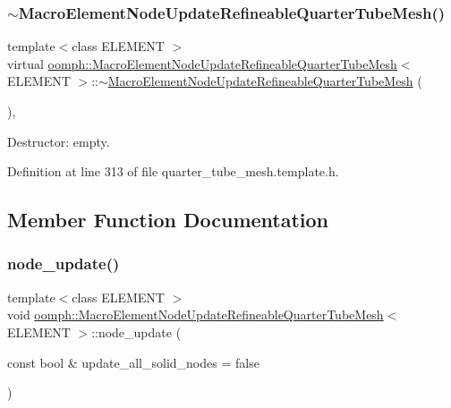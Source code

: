 \subsubsection{\texorpdfstring{$\sim$\+Macro\+Element\+Node\+Update\+Refineable\+Quarter\+Tube\+Mesh()}{~MacroElementNodeUpdateRefineableQuarterTubeMesh()}}
{\footnotesize\ttfamily template$<$class E\+L\+E\+M\+E\+NT $>$ \\
virtual \hyperlink{classoomph_1_1MacroElementNodeUpdateRefineableQuarterTubeMesh}{oomph\+::\+Macro\+Element\+Node\+Update\+Refineable\+Quarter\+Tube\+Mesh}$<$ E\+L\+E\+M\+E\+NT $>$\+::$\sim$\hyperlink{classoomph_1_1MacroElementNodeUpdateRefineableQuarterTubeMesh}{Macro\+Element\+Node\+Update\+Refineable\+Quarter\+Tube\+Mesh} (\begin{DoxyParamCaption}{ }\end{DoxyParamCaption})\hspace{0.3cm}{\ttfamily [inline]}, {\ttfamily [virtual]}}



Destructor\+: empty. 



Definition at line 313 of file quarter\+\_\+tube\+\_\+mesh.\+template.\+h.



\subsection{Member Function Documentation}
\mbox{\label{classoomph_1_1MacroElementNodeUpdateRefineableQuarterTubeMesh_a6255c22765a484ac11642ade0c084082}} 
\subsubsection{\texorpdfstring{node\+\_\+update()}{node\_update()}}
{\footnotesize\ttfamily template$<$class E\+L\+E\+M\+E\+NT $>$ \\
void \hyperlink{classoomph_1_1MacroElementNodeUpdateRefineableQuarterTubeMesh}{oomph\+::\+Macro\+Element\+Node\+Update\+Refineable\+Quarter\+Tube\+Mesh}$<$ E\+L\+E\+M\+E\+NT $>$\+::node\+\_\+update (\begin{DoxyParamCaption}\item[{const bool \&}]{update\+\_\+all\+\_\+solid\+\_\+nodes = {\ttfamily false} }\end{DoxyParamCaption})\hspace{0.3cm}{\ttfamily [inline]}}



